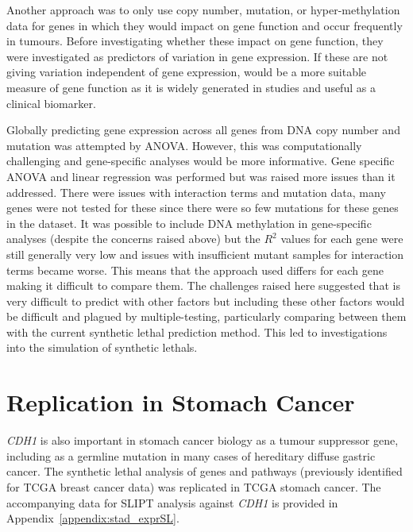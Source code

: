 Another approach was to only use copy number, \gls{mutation}, or hyper-methylation data for genes in which they would impact on gene function and occur frequently in tumours. Before investigating whether these impact on gene function, they were investigated as predictors of variation in \gls{gene expression}. If these are not giving variation independent of \gls{gene expression},  would be a more suitable measure of gene function as it is widely generated in studies and useful as a clinical biomarker.

Globally predicting \gls{gene expression} across all genes from \acrshort{DNA} copy number and  \gls{mutation} was attempted by \gls{ANOVA}. However, this was computationally challenging and gene-specific analyses would be more informative. Gene specific \gls{ANOVA} and linear regression was performed but was raised more issues than it addressed. There were issues with interaction terms and \gls{mutation} data, many genes were not tested for these since there were so few \glspl{mutation} for these genes in the dataset.  It was possible to include \acrshort{DNA} methylation in gene-specific analyses (despite the concerns raised above) but the $R^2$ values for each gene were still generally very low and issues with insufficient \gls{mutant} samples for interaction terms became worse. This means that the approach used differs for each gene making it difficult to compare them. The challenges raised here suggested that  is very difficult to predict with other factors but including these other factors would be difficult and plagued by multiple-testing, particularly comparing between them with the current \gls{synthetic lethal} prediction method. This led to investigations into the simulation of \glspl{synthetic lethal}.
\fi

\FloatBarrier

\section{Replication in Stomach Cancer} \label{chapt3:stad_replication}

\textit{CDH1} is also important in stomach cancer biology as a  \gls{tumour suppressor} gene, including as a \gls{germline} \gls{mutation} in many cases of \gls{hereditary} diffuse gastric cancer. The \gls{synthetic lethal} analysis of genes and \glspl{pathway} (previously identified for \gls{TCGA} breast cancer data) was replicated in \gls{TCGA} stomach cancer. The accompanying data for \gls{SLIPT} analysis against \textit{CDH1}  is provided in Appendix~\ref{appendix:stad_exprSL}.

